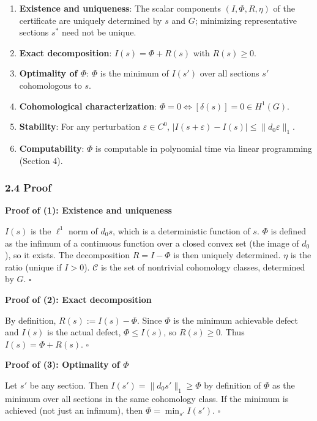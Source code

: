 \documentclass[
]{article}
\begin{document}
\begin{enumerate}
\def\labelenumi{\arabic{enumi}.}
\item
  \textbf{Existence and uniqueness}: The scalar components
  \((I, \Phi, R, \eta)\) of the certificate are uniquely determined by
  \(s\) and \(G\); minimizing representative sections \(s^*\) need not
  be unique.
\item
  \textbf{Exact decomposition}: \(I(s) = \Phi + R(s)\) with
  \(R(s) \geq 0\).
\item
  \textbf{Optimality of \(\Phi\)}: \(\Phi\) is the minimum of \(I(s')\)
  over all sections \(s'\) cohomologous to \(s\).
\item
  \textbf{Cohomological characterization}:
  \(\Phi = 0 \iff [\delta(s)] = 0 \in H^1(G)\).
\item
  \textbf{Stability}: For any perturbation \(\varepsilon \in C^0\),
  \(|I(s + \varepsilon) - I(s)| \leq \|d_0 \varepsilon\|_1\).
\item
  \textbf{Computability}: \(\Phi\) is computable in polynomial time via
  linear programming (Section 4).
\end{enumerate}

\subsubsection{2.4 Proof}\label{proof}

\textbf{Proof of (1): Existence and uniqueness}

\(I(s)\) is the \(\ell^1\) norm of \(d_0 s\), which is a deterministic
function of \(s\). \(\Phi\) is defined as the infimum of a continuous
function over a closed convex set (the image of \(d_0\)), so it exists.
The decomposition \(R = I - \Phi\) is then uniquely determined. \(\eta\)
is the ratio (unique if \(I > 0\)). \(\mathcal{C}\) is the set of
nontrivial cohomology classes, determined by \(G\). \(\square\)

\textbf{Proof of (2): Exact decomposition}

By definition, \(R(s) := I(s) - \Phi\). Since \(\Phi\) is the minimum
achievable defect and \(I(s)\) is the actual defect, \(\Phi \leq I(s)\),
so \(R(s) \geq 0\). Thus \(I(s) = \Phi + R(s)\). \(\square\)

\textbf{Proof of (3): Optimality of \(\Phi\)}

Let \(s'\) be any section. Then \(I(s') = \|d_0 s'\|_1 \geq \Phi\) by
definition of \(\Phi\) as the minimum over all sections in the same
cohomology class. If the minimum is achieved (not just an infimum), then
\(\Phi = \min_{s'} I(s')\). \(\square\)
\end{document}
